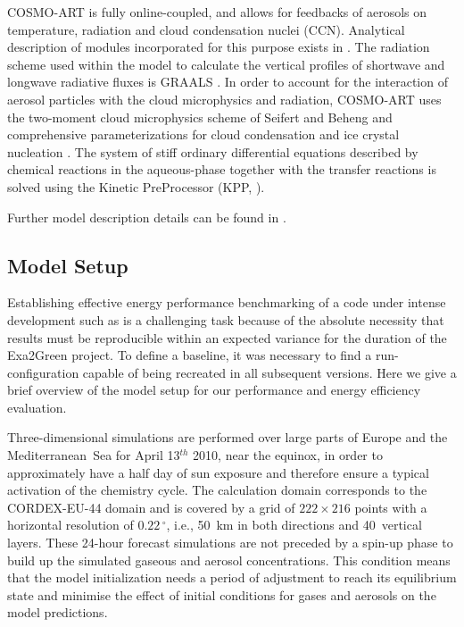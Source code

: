 COSMO-ART  is  fully  online-coupled,  and  allows  for  feedbacks  of
aerosols  on  temperature,  radiation  and cloud  condensation  nuclei
(CCN).   Analytical  description  of  modules  incorporated  for  this
purpose  exists  in  \cite{Vogel-2009, Bangert-2011}.   The  radiation
scheme used  within the  model to calculate  the vertical  profiles of
shortwave and longwave  radiative fluxes is GRAALS \cite{Ritter-1992}.
In order to account for  the interaction of aerosol particles with the
cloud microphysics and radiation,  COSMO-ART uses the two-moment cloud
microphysics  scheme  of Seifert  and  Beheng \cite{Seifert-2006}  and
comprehensive parameterizations for cloud condensation and ice crystal
nucleation  \cite{Bangert-2011, Bangert-2012}.   The  system of  stiff
ordinary differential equations described by chemical reactions in the
aqueous-phase together with the transfer reactions is solved using the
Kinetic PreProcessor (KPP, \cite{Damian-2002}).

Further model description details  can be found in \cite{Bangert-2012,
  Knote-2011, Knote-2013}.

\subsection{Model Setup}
\label{subsec:1.2}

Establishing effective energy performance benchmarking of a code under
intense development such as \cosmoart is a challenging task because of
the  absolute necessity that  results must  be reproducible  within an
expected variance  for the duration of the  Exa2Green pro\-je\-ct.  To
define  a  baseline, it  was  necessary  to  find a  run-configuration
capable of being recreated in all subsequent versions.  Here we give a
brief  overview of  the model  setup  for our  performance and  energy
efficiency evaluation.

Three-dimensional simulations are performed over large parts of Europe
and the Mediterranean~Sea for  April 13$^{th}$ 2010, near the equinox,
in  order  to  approximately have  a  half  day  of sun  exposure  and
therefore  ensure a typical  activation of  the chemistry  cycle.  The
calculation  domain  corresponds to  the  CORDEX-EU-44  domain and  is
covered  by  a  grid  of  $222\times 216$  points  with  a  horizontal
resolution  of $0.22\,^{\circ}$,  i.e., 50~km  in both  directions and
40~vertical  layers.   These  24-hour  forecast  simulations  are  not
preceded  by a spin-up  phase to  build up  the simulated  gaseous and
aerosol   concentrations.   This  condition   means  that   the  model
initialization needs  a period of adjustment to  reach its equilibrium
state  and minimise  the effect  of initial  conditions for  gases and
aerosols on the model predictions.

